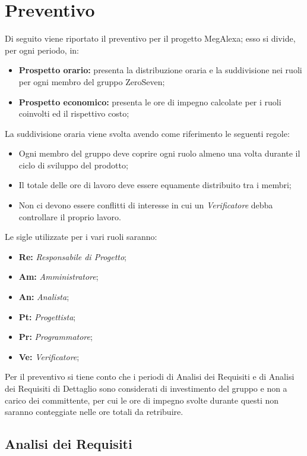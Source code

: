 \chapter{Preventivo}
Di seguito viene riportato il preventivo per il progetto MegAlexa; esso si divide, per ogni periodo, in:
\begin{itemize}
	\item \textbf{Prospetto orario:} presenta la distribuzione oraria e la suddivisione nei ruoli per ogni membro del gruppo ZeroSeven;
	\item \textbf{Prospetto economico:} presenta le ore di impegno calcolate per i ruoli coinvolti ed il rispettivo costo;
\end{itemize}
La suddivisione oraria viene svolta avendo come riferimento le seguenti regole:
\begin{itemize}
	\item Ogni membro del gruppo deve coprire ogni ruolo almeno una volta durante il ciclo di sviluppo del prodotto;
	\item Il totale delle ore di lavoro deve essere equamente distribuito tra i membri;
	\item Non ci devono essere conflitti di interesse in cui un \textit{Verificatore} debba controllare il proprio lavoro.
\end{itemize}
Le sigle utilizzate per i vari ruoli saranno:
\begin{itemize}
	\item \textbf{Re:} \textit{Responsabile di Progetto};
	\item \textbf{Am:} \textit{Amministratore};
	\item \textbf{An:} \textit{Analista};
	\item \textbf{Pt:} \textit{Progettista};
	\item \textbf{Pr:} \textit{Programmatore};
	\item \textbf{Ve:} \textit{Verificatore};
\end{itemize}

Per il preventivo si tiene conto che i periodi di Analisi dei Requisiti e di Analisi dei Requisiti di Dettaglio sono considerati di investimento del gruppo e  non a carico dei committente, per cui  le ore di impegno svolte durante questi non saranno conteggiate nelle ore totali da retribuire.

\newpage
\section{Analisi  dei Requisiti}
